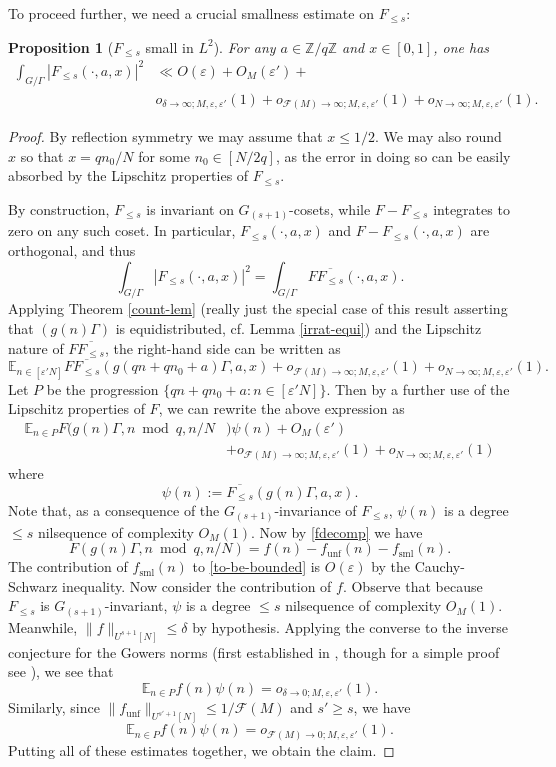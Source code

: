 \documentclass[11pt,reqno]{amsart}
\numberwithin{equation}{section}
\theoremstyle{plain}
\newtheorem{proposition}[subsection]{Proposition}
\theoremstyle{definition}
\renewcommand{\leq}{\leqslant}
\renewcommand{\geq}{\geqslant}
\renewcommand{\mod}{{\ \operatorname{mod}\ }}
\newcommand\E{{\mathbb{E}}}
\newcommand\Z{\mathbb{Z}}
\newcommand\1{{\bf 1}}
\newcommand\2{{\bf 2}}
\newcommand\eps{\varepsilon}
\newcommand\sml{{\operatorname{sml}}}
\newcommand\unf{{\operatorname{unf}}}
\newcommand\Grow{{\mathcal F}}
\begin{document}
To proceed further, we need a crucial smallness estimate on $F_{\leq s}$:

\begin{proposition}[$F_{\leq s}$ small in $L^2$]  For any $a \in \Z/q\Z$ and $x \in [0,1]$, one has
\begin{align*} \int_{G/\Gamma} |F_{\leq s}(\cdot,a,x)|^2 &\ll O(\eps) + O_M(\eps') +\\ & o_{\delta \to \infty; M,\eps,\eps'}(1) + o_{\Grow(M) \to \infty; M,\eps,\eps'}(1) + o_{N \to\infty;M,\eps,\eps'}(1).\end{align*}
\end{proposition}
\begin{proof} By reflection symmetry we may assume that $x \leq 1/2$.  We may also round $x$ so that $x=qn_0/N$ for some $n_0 \in [N/2q]$, as the error in doing so can be easily absorbed by the Lipschitz properties of $F_{\leq s}$.

By construction, $F_{\leq s}$ is invariant on $G_{(s+1)}$-cosets, while $F-F_{\leq s}$ integrates to zero on any such coset.  In particular, $F_{\leq s}(\cdot,a,x)$ and $F-F_{\leq s}(\cdot,a,x)$ are orthogonal, and thus
$$ \int_{G/\Gamma} |F_{\leq s}(\cdot,a,x)|^2 = \int_{G/\Gamma} F \overline{F_{\leq s}}(\cdot,a,x).$$
Applying Theorem \ref{count-lem} (really just the special case of this result asserting that $(g(n)\Gamma)$ is equidistributed, cf. Lemma \ref{irrat-equi}) and the Lipschitz nature of $F \overline{F_{\leq s}}$, the right-hand side can be written as
$$ \E_{n \in [\eps' N]} F \overline{F_{\leq s}}(g(qn+qn_0+a)\Gamma,a,x) + o_{\Grow(M) \to \infty; M,\eps,\eps'}(1) +  o_{N \to\infty;M,\eps,\eps'}(1).$$
Let $P$ be the progression $\{ qn+qn_0+a: n \in [\eps' N]\}$.  Then by a further use of the Lipschitz properties of $F$, we can rewrite the above expression as
\begin{align}\nonumber\E_{n \in P} F(g(n)\Gamma,  n \mod q, n/N&) \psi(n) + O_M(\eps') \\ &+ o_{\Grow(M) \to \infty; M,\eps,\eps'}(1) + o_{N \to\infty;M,\eps,\eps'}(1)\label{to-be-bounded}\end{align}
where
$$ \psi(n) := \overline{F_{\leq s}}(g(n)\Gamma,a,x).$$
Note that, as a consequence of the $G_{(s+1)}$-invariance of $F_{\leq s}$, $\psi(n)$ is a degree $\leq s$ nilsequence of complexity $O_M(1)$.
Now by \eqref{fdecomp} we have
$$F(g(n)\Gamma, n \mod q, n/N) = f(n) - f_\unf(n) - f_\sml(n).$$
The contribution of $f_\sml(n)$ to \eqref{to-be-bounded} is $O(\eps)$ by the Cauchy-Schwarz inequality.  Now consider the contribution of $f$.  Observe that because $F_{\leq s}$ is $G_{(s+1)}$-invariant, $\psi$ is a degree $\leq s$ nilsequence of complexity $O_M(1)$.   Meanwhile, $\|f\|_{U^{s+1}[N]} \leq \delta$ by hypothesis. Applying the converse to the inverse conjecture for the Gowers norms (first established in \cite{green-tao-u3inverse}, though for a simple proof see \cite[Appendix G]{green-tao-ziegler-u4inverse}), we see that
$$ \E_{n \in P} f(n) \psi(n) = o_{\delta \to 0; M,\eps,\eps'}(1).$$
Similarly, since $\|f_\unf\|_{U^{s'+1}[N]} \leq 1/\Grow(M)$ and $s' \geq s$, we have
$$ \E_{n \in P} f(n) \psi(n) = o_{\Grow(M) \to 0; M,\eps,\eps'}(1).$$
Putting all of these estimates together, we obtain the claim.
\end{proof}
\end{document}
